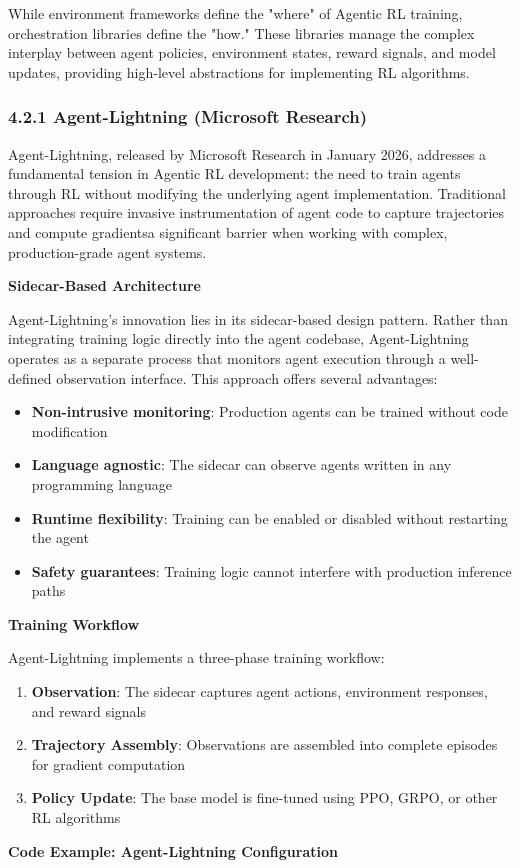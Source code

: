 While environment frameworks define the "where" of Agentic RL training, orchestration libraries define the "how." These libraries manage the complex interplay between agent policies, environment states, reward signals, and model updates, providing high-level abstractions for implementing RL algorithms.

\subsubsection{4.2.1 Agent-Lightning (Microsoft Research)}

Agent-Lightning, released by Microsoft Research in January 2026, addresses a fundamental tension in Agentic RL development: the need to train agents through RL without modifying the underlying agent implementation. Traditional approaches require invasive instrumentation of agent code to capture trajectories and compute gradientsa significant barrier when working with complex, production-grade agent systems.

\textbf{Sidecar-Based Architecture}

Agent-Lightning's innovation lies in its sidecar-based design pattern. Rather than integrating training logic directly into the agent codebase, Agent-Lightning operates as a separate process that monitors agent execution through a well-defined observation interface. This approach offers several advantages:

\begin{itemize}
    \item \textbf{Non-intrusive monitoring}: Production agents can be trained without code modification
    \item \textbf{Language agnostic}: The sidecar can observe agents written in any programming language
    \item \textbf{Runtime flexibility}: Training can be enabled or disabled without restarting the agent
    \item \textbf{Safety guarantees}: Training logic cannot interfere with production inference paths

\end{itemize}
\textbf{Training Workflow}

Agent-Lightning implements a three-phase training workflow:

\begin{enumerate}
    \item \textbf{Observation}: The sidecar captures agent actions, environment responses, and reward signals
    \item \textbf{Trajectory Assembly}: Observations are assembled into complete episodes for gradient computation
    \item \textbf{Policy Update}: The base model is fine-tuned using PPO, GRPO, or other RL algorithms

\end{enumerate}
\textbf{Code Example: Agent-Lightning Configuration}

